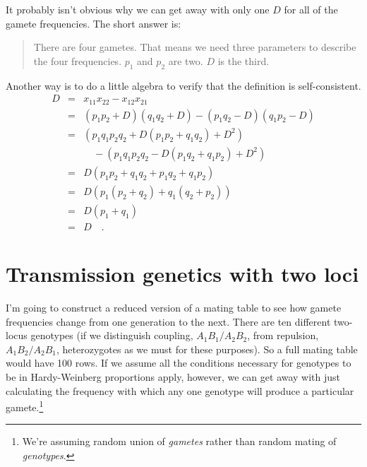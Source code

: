 It probably isn't obvious why we can get away with only one $D$ for
all of the gamete frequencies. The short answer is:
\begin{quote}There are four gametes. That means we need three
  parameters to describe the four frequencies. $p_1$ and $p_2$ are
  two. $D$ is the third.
\end{quote}
Another way is to do a little algebra to verify that the definition is
self-consistent.
\begin{eqnarray*}
D &=& x_{11}x_{22} - x_{12}x_{21} \\
  &=& (p_1p_2 + D)(q_1q_2 + D) - (p_1q_2 - D)(q_1p_2 - D) \\
  &=& \left(p_1q_1p_2q_2 + D(p_1p_2 + q_1q_2) + D^2\right) \\
  && \quad - \left(p_1q_1p_2q_2 - D(p_1q_2 + q_1p_2) + D^2\right) \\
  &=& D(p_1p_2 + q_1q_2 + p_1q_2 + q_1p_2) \\
  &=& D\left(p_1(p_2 + q_2) + q_1(q_2 + p_2)\right) \\
  &=& D(p_1 + q_1) \\
  &=& D \quad. 
\end{eqnarray*}

\section*{Transmission genetics with two loci}

I'm going to construct a reduced version of a mating table to see how
gamete frequencies change from one generation to the next. There are
ten different two-locus genotypes (if we distinguish coupling,
$A_1B_1/A_2B_2$, from repulsion, $A_1B_2/A_2B_1$, heterozygotes as we
must for these purposes). So a full mating table would have 100
rows. If we assume all the conditions necessary for genotypes to be in
Hardy-Weinberg proportions apply, however, we can get away with just
calculating the frequency with which any one genotype will produce a
particular gamete.\footnote{We're assuming random union of {\it
    gametes\/} rather than random mating of {\it
    genotypes}.}

